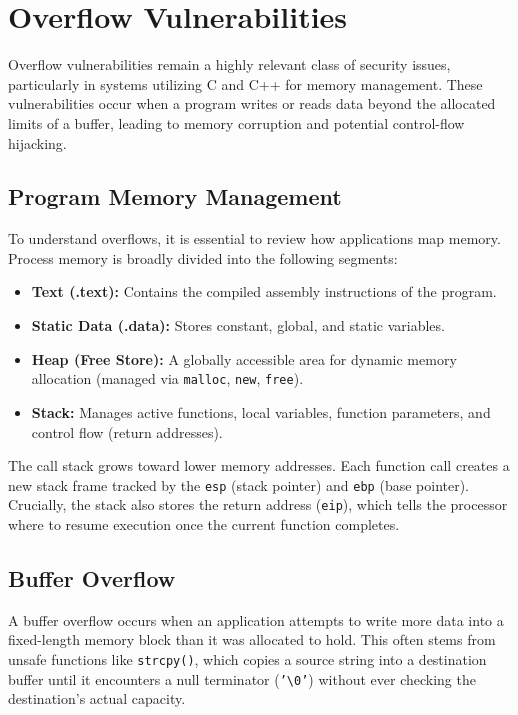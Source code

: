 \chapter{Overflow Vulnerabilities}
\label{ch:overflows}

Overflow vulnerabilities remain a highly relevant class of security issues, particularly in systems utilizing \textsf{C} and \textsf{C++} for memory management. These vulnerabilities occur when a program writes or reads data beyond the allocated limits of a buffer, leading to memory corruption and potential control-flow hijacking. 

\section{Program Memory Management}
To understand overflows, it is essential to review how applications map memory. Process memory is broadly divided into the following segments:
\begin{itemize}
    \item \textbf{Text (.text):} Contains the compiled assembly instructions of the program.
    \item \textbf{Static Data (.data):} Stores constant, global, and static variables.
    \item \textbf{Heap (Free Store):} A globally accessible area for dynamic memory allocation (managed via \texttt{malloc}, \texttt{new}, \texttt{free}).
    \item \textbf{Stack:} Manages active functions, local variables, function parameters, and control flow (return addresses).
\end{itemize}

The call stack grows toward lower memory addresses. Each function call creates a new stack frame tracked by the \texttt{esp} (stack pointer) and \texttt{ebp} (base pointer). Crucially, the stack also stores the return address (\texttt{eip}), which tells the processor where to resume execution once the current function completes.

\section{Buffer Overflow}
A buffer overflow occurs when an application attempts to write more data into a fixed-length memory block than it was allocated to hold. This often stems from unsafe functions like \texttt{strcpy()}, which copies a source string into a destination buffer until it encounters a null terminator (\texttt{'\textbackslash 0'}) without ever checking the destination's actual capacity.

